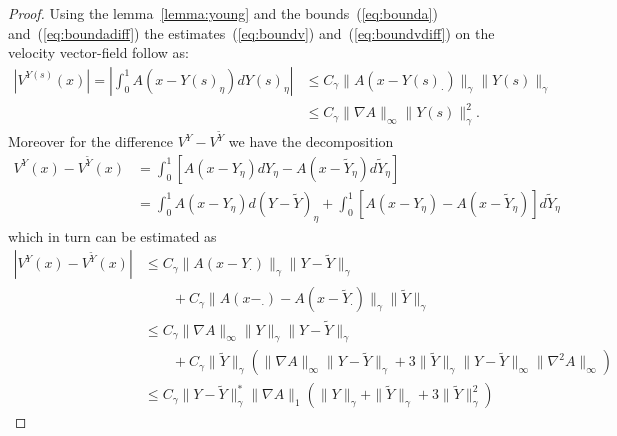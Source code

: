 \documentclass[a4paper,12pt,reqno]{amsart}
\newcommand{\wt}{\widetilde}
\newcommand{\norm}[1]{\|#1\|}
\begin{document}
\begin{proof}
Using the lemma~\ref{lemma:young} and the bounds~(\ref{eq:bounda})
and~(\ref{eq:boundadiff}) the estimates~(\ref{eq:boundv})
and~(\ref{eq:boundvdiff}) on the velocity vector-field follow as:
\begin{equation*}
  \begin{split}
| V^{Y(s)}(x)| = \left| \int_0^1  A(x-Y(s)_\eta) dY(s)_\eta \right|
   & \le  C_\gamma
 \| A(x-Y(s)_{\cdot})\|_{\gamma} \|Y(s)\|_{\gamma}
\\ & \le    C_\gamma  \|\nabla A\|_\infty \|Y(s)\|_{\gamma}^2.
  \end{split}
\end{equation*}
Moreover for the difference $V^Y - V^{\wt Y}$ we have the decomposition
\begin{equation*}
  \begin{split}
    V^{Y}(x) - V^{\wt Y}(x)  & = \int_0^1 \left[
    A(x-Y_{\eta})dY_\eta - A(x-\wt Y_{\eta})d\wt
    Y_\eta\right]
\\ & =  \int_0^1
    A(x-Y_{\eta}) d (Y-\wt Y)_\eta
+ \int_0^1
    \left[ A(x-Y_{\eta})- A(x-\wt Y_{\eta})\right]
    d\wt Y_\eta
  \end{split}
\end{equation*}
which in turn can be estimated as
\begin{equation*}
  \begin{split}
| V^{Y}(x)- V^{\wt Y}(x)| & \le C_\gamma \| A(x-Y_\cdot)
\|_{\gamma} \|Y-\wt Y\|_{\gamma}
\\ & \qquad
+ C_\gamma \| A(x-_\cdot)-
A(x-\wt Y_\cdot) \|_{\gamma} \|\wt Y\|_{\gamma}
%
\\ & \le C_\gamma  \|\nabla A\|_\infty \|Y\|_{\gamma}
\|Y-\wt Y\|_{\gamma}
\\ & \qquad
+ C_\gamma  \|\wt Y\|_{\gamma}
(
\|\nabla A\|_\infty \|Y-\wt Y\|_{\gamma} +3
\norm{\wt Y}_{\gamma} \norm{Y-\wt Y}_{\infty} \norm{\nabla^2 A}_\infty
)
\\ & \le  C_\gamma \norm{Y-\wt Y}_{\gamma}^*
\norm{\nabla A}_{1}(\norm{Y}_{\gamma}+\norm{\wt Y}_{\gamma}+3\norm{\wt Y}_{\gamma}^2)
  \end{split}
\end{equation*}
\end{proof}
\end{document}
